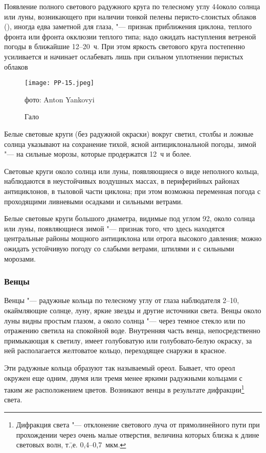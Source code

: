  Появление полного светового радужного круга по телесному углу
44\gr около солнца или луны, возникающего при наличии тонкой пелены
перисто-слоистых облаков (), иногда едва заметной для
глаза, "--- признак приближения циклона, теплого фронта или фронта
окклюзии теплого типа; надо ожидать наступления ветреной погоды в
ближайшие 12--20~ч. При этом яркость светового круга постепенно
усиливается и начинает ослабевать лишь при сильном уплотнении перистых
облаков

\begin{figure}[htb]
  \centering{}
  \texttt{[image: PP-15.jpeg]}
  \caption{Гало}
  \label{fig:pp15}
  \small
  \centering{}фото: Anton Yankovyi
\end{figure}

 Белые световые круги (без радужной окраски) вокруг светил,
столбы и ложные солнца указывают на сохранение тихой, ясной
антициклональной погоды, зимой "--- на сильные морозы, которые продержатся
12~ч и более.

 Световые круги около солнца или луны, появляющиеся о виде
неполного кольца, наблюдаются в неустойчивых воздушных массах, в
периферийных районах антициклонов, в тыловой части циклона; при этом
возможна переменная погода с проходящими ливневыми осадками и сильными
ветрами.

 Белые световые круги большого диаметра, видимые под углом 92\gr,
около солнца или луны, появляющиеся зимой "--- признак того, что здесь
находятся центральные районы мощного антициклона или отрога высокого
давления; можно ожидать устойчивую погоду со слабыми ветрами, штилями
и с сильными морозами.

\subsubsection{Венцы}

Венцы "--- радужные кольца по телесному углу от глаза наблюдателя
2--10\gr, окаймляющие солнце, луну, яркие звезды и другие источники
света. Венцы около луны видны простым глазом, а около солнца "--- через
темное стекло или по отражению светила на спокойной воде. Внутренняя
часть венца, непосредственно примыкающая к светилу, имеет голубоватую
или голубовато-белую окраску, за ней располагается желтоватое кольцо,
переходящее снаружи в красное.

Эти радужные кольца образуют так называемый ореол. Бывает, что ореол
окружен еще одним, двумя или тремя менее яркими радужными кольцами с
таким же расположением цветов. Возникают венцы в результате
дифракции\footnote{Дифракция света "--- отклонение светового луча от
  прямолинейного пути при прохождении через очень малые отверстия,
  величина которых близка к длине световых волн,
  т.\=,е. 0,4--0,7~мкм.} света.

